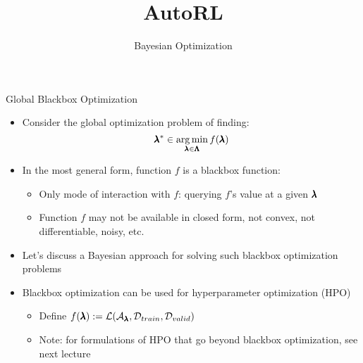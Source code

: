 \documentclass[aspectratio=169]{../latex_main/tntbeamer}  %
\title[AutoRL]{AutoRL}
\subtitle{Bayesian Optimization}
\begin{document}
	
	\maketitle



\begin{frame}[c]{Global Blackbox Optimization}
    
    \begin{itemize}
        \item Consider the \alert{global optimization problem} of finding: 
        \[\pmb{\lambda}^* \in \operatorname*{arg\,min}_{\pmb{\lambda} \in \pmb{\Lambda}} f(\pmb{\lambda})\]
        
\pause
        \item In the most general form, function $f$ is a \alert{blackbox function}:
    	
    	\begin{center}
\scalebox{0.5}{}
    	\end{center}

    
   \begin{itemize}
    	\item Only mode of interaction with $f$: querying $f$'s value at a given $\pmb{\lambda}$ 
        \item Function $f$ may not be available in closed form, not convex, not differentiable, noisy, etc. 
   \end{itemize}
\medskip
\pause

        \item Let's discuss a \alert{Bayesian} approach for solving such blackbox optimization problems
\medskip
\pause
        \item Blackbox optimization can be used for hyperparameter optimization (HPO)
   	 	\begin{itemize}
         	\item Define \alert{$f(\pmb{\lambda}) := \mathcal{L}( \mathcal{A}_{\pmb{\lambda}}, \mathcal{D}_{train}, \mathcal{D}_{valid} )$}
        	\item Note: for formulations of HPO that go beyond blackbox optimization, see next lecture
        \end{itemize}
    \end{itemize}
\end{frame}
\end{document}
